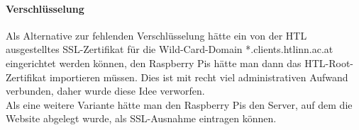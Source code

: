 \paragraph{Verschlüsselung\\}

Als Alternative zur fehlenden Verschlüsselung hätte ein von der HTL ausgestelltes SSL-Zertifikat für die Wild-Card-Domain *.clients.htlinn.ac.at eingerichtet werden können, den Raspberry Pis hätte man dann das HTL-Root-Zertifikat importieren müssen. Dies ist mit recht viel administrativen Aufwand verbunden, daher wurde diese Idee verworfen.\\
Als eine weitere Variante hätte man den Raspberry Pis den Server, auf dem die Website abgelegt wurde, als SSL-Ausnahme eintragen können. 